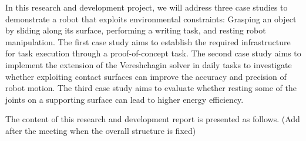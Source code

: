 \documentclass[report.tex]{subfiles}
\begin{document}
    In this research and development project, we will address three case studies to demonstrate a robot that exploits environmental constraints: Grasping an object by sliding along its surface, performing a writing task, and resting robot manipulation. The first case study aims to establish the required infrastructure for task execution through a proof-of-concept task. The second case study aims to implement the extension of the Vereshchagin solver in daily tasks to investigate whether exploiting contact surfaces can improve the accuracy and precision of robot motion. The third case study aims to evaluate whether resting some of the joints on a supporting surface can lead to higher energy efficiency.

    The content of this research and development report is presented as follows. (Add after the meeting when the overall structure is fixed)
    
\end{document}
